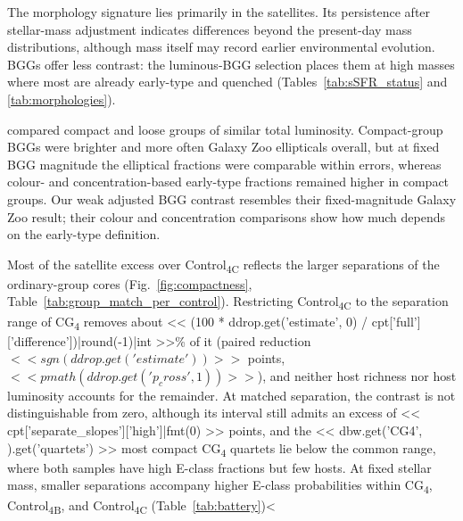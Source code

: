 \documentclass{aa}
\newcommand{\CB}{Control\textsubscript{4B}}
\newcommand{\CC}{Control\textsubscript{4C}}
\newcommand{\CG}{CG\textsubscript{4}}
\begin{document}
The morphology signature lies primarily in the satellites. Its persistence after stellar-mass adjustment indicates differences beyond the present-day mass distributions, although mass itself may record earlier environmental evolution. BGGs offer less contrast: the luminous-BGG selection places them at high masses where most are already early-type and quenched (Tables~\ref{tab:sSFR_status} and \ref{tab:morphologies}).

\citet{Martinez+13} compared compact and loose groups of similar total luminosity. Compact-group BGGs were brighter and more often Galaxy Zoo ellipticals overall, but at fixed BGG magnitude the elliptical fractions were comparable within errors, whereas colour- and concentration-based early-type fractions remained higher in compact groups. Our weak adjusted BGG contrast resembles their fixed-magnitude Galaxy Zoo result; their colour and concentration comparisons show how much depends on the early-type definition.

Most of the satellite excess over \CC{} reflects the larger separations of the ordinary-group cores (Fig.~\ref{fig:compactness}, Table~\ref{tab:group_match_per_control}). Restricting \CC{} to the separation range of \CG{} removes about << (100 * ddrop.get('estimate', 0) / cpt['full']['difference'])|round(-1)|int >>\% of it (paired reduction \(<< sgn(ddrop.get('estimate')) >>\) points, \(<< pmath(ddrop.get('p_cross', 1)) >>\)), and neither host richness nor host luminosity accounts for the remainder. At matched separation, the contrast is not distinguishable from zero, although its interval still admits an excess of << cpt['separate_slopes']['high']|fmt(0) >> points, and the << dbw.get('CG4', {}).get('quartets') >> most compact \CG{} quartets lie below the common range, where both samples have high E-class fractions but few hosts. At fixed stellar mass, smaller separations accompany higher E-class probabilities within \CG{}, \CB{}, and \CC{} (Table~\ref{tab:battery})<%
\end{document}
